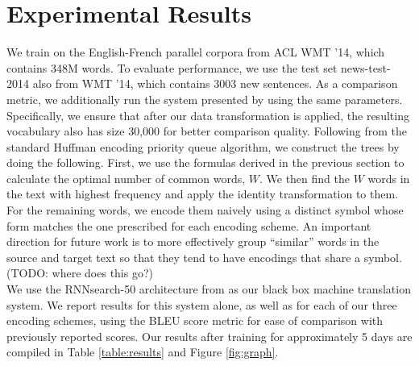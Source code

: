 \section{Experimental Results}
\label{sec:exp}

We train on the English-French parallel corpora from ACL WMT '14, which contains
348M words. To evaluate performance, we use the test set news-test-2014 also from
WMT '14, which contains 3003 new sentences. As a comparison metric, we additionally run the system presented by
 using the same parameters. Specifically, we ensure
that after our data transformation is applied, the resulting vocabulary also has size
30,000 for better comparison quality. Following from the standard Huffman encoding
priority queue algorithm, we construct the trees by doing the following. First, we use
the formulas derived in the previous section to calculate the optimal number of
common words, $W$. We then find the $W$ words in the text with highest frequency and
apply the identity transformation to them. For the remaining words, we encode them
naively using a distinct symbol whose form matches the one prescribed for each
encoding scheme. An important direction for future work is to more effectively
group ``similar'' words in the source and target text so that they tend to have
encodings that share a symbol. (TODO: where does this go?)\\

We use the RNNsearch-50 architecture from  as
our black box machine translation system. We report results for this system alone,
as well as for each of our three encoding schemes, using the BLEU score metric for
ease of comparison with previously reported scores. Our results after training
for approximately 5 days are compiled in Table \ref{table:results} and Figure \ref{fig:graph}.

\begin{table}
  \centering
  \vspace{8pt}
  \caption{BLEU scores on detokenized test set for various encoding
    schemes after training for 5 days.}
  \label{table:results}
\end{table}

